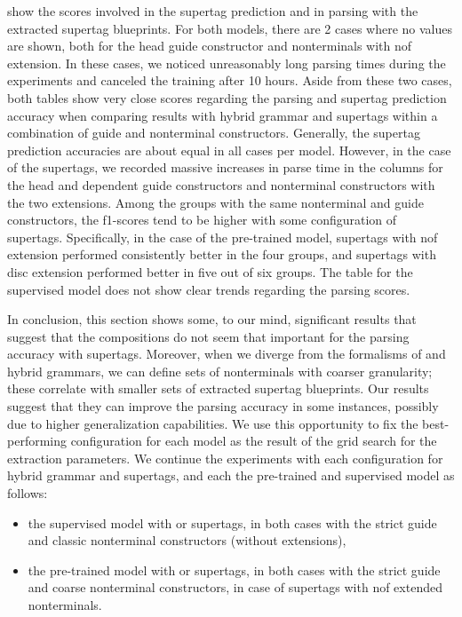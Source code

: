 \documentclass[../../document.tex]{subfiles}
\begin{document}
     show the scores involved in the supertag prediction and in parsing with the extracted supertag blueprints.
    For both models, there are 2 cases where no values are shown, both for the head guide constructor and nonterminals with nof extension.
    In these cases, we noticed unreasonably long parsing times during the experiments and canceled the training after 10 hours.
    Aside from these two cases, both tables show very close scores regarding the parsing and supertag prediction accuracy when comparing results with hybrid grammar and  supertags within a combination of guide and nonterminal constructors.
    Generally, the supertag prediction accuracies are about equal in all cases per model.
    However, in the case of the  supertags, we recorded massive increases in parse time in the columns for the head and dependent guide constructors and nonterminal constructors with the two extensions.
    Among the groups with the same nonterminal and guide constructors, the f1-scores tend to be higher with some configuration of  supertags.
    Specifically, in the case of the pre-trained model,  supertags with nof extension performed consistently better in the four groups, and  supertags with disc extension performed better in five out of six groups.
    The table for the supervised model does not show clear trends regarding the parsing scores.

    In conclusion, this section shows some, to our mind, significant results that suggest that the  compositions do not seem that important for the parsing accuracy with supertags.
    Moreover, when we diverge from the formalisms of  and hybrid grammars, we can define sets of nonterminals with coarser granularity; these correlate with smaller sets of extracted supertag blueprints.
    Our results suggest that they can improve the parsing accuracy in some instances, possibly due to higher generalization capabilities.
    We use this opportunity to fix the best-performing configuration for each model as the result of the grid search for the extraction parameters.
    We continue the experiments with each configuration for hybrid grammar and  supertags, and each the pre-trained and supervised model as follows:
    \begin{itemize}
        \item the supervised model with  or  supertags, in both cases with the strict guide and classic nonterminal constructors (without extensions),
        \item the pre-trained model with  or  supertags, in both cases with the strict guide and coarse nonterminal constructors, in case of  supertags with nof extended nonterminals.
    \end{itemize}
\end{document}
